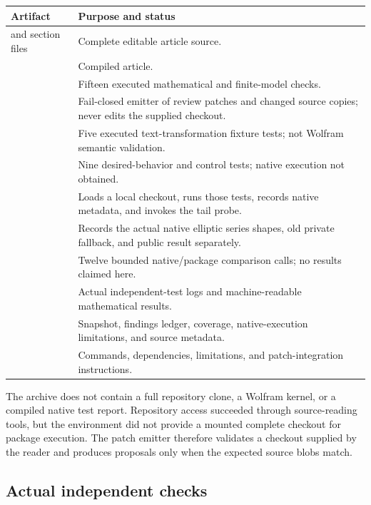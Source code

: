 \begin{longtable}{@{}P{6.0cm}P{8.9cm}@{}}
\toprule Artifact & Purpose and status \\\midrule
\endhead
{} and section files & Complete editable article source.\\
 & Compiled article.\\
 & Fifteen executed mathematical and finite-model checks.\\
 & Fail-closed emitter of review patches and changed source copies; never edits the supplied checkout.\\
 & Five executed text-transformation fixture tests; not Wolfram semantic validation.\\
 & Nine desired-behavior and control tests; native execution not obtained.\\
 & Loads a local checkout, runs those tests, records native metadata, and invokes the tail probe.\\
 & Records the actual native elliptic series shapes, old private fallback, and public result separately.\\
 & Twelve bounded native/package comparison calls; no results claimed here.\\
 & Actual independent-test logs and machine-readable mathematical results.\\
 & Snapshot, findings ledger, coverage, native-execution limitations, and source metadata.\\
 & Commands, dependencies, limitations, and patch-integration instructions.\\
\bottomrule
\end{longtable}

The archive does not contain a full repository clone, a Wolfram kernel, or a compiled native test report. Repository access succeeded through source-reading tools, but the environment did not provide a mounted complete checkout for package execution. The patch emitter therefore validates a checkout supplied by the reader and produces proposals only when the expected source blobs match.

\subsection{Actual independent checks}

